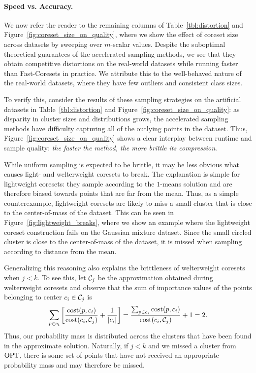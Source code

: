\paragraph*{Speed vs. Accuracy.}



We now refer the reader to the remaining columns of Table~\ref{tbl:distortion} and Figure~\ref{fig:coreset_size_on_quality}, where we show the effect of coreset
size across datasets by sweeping over $m$-scalar values. Despite the suboptimal theoretical guarantees of the accelerated sampling methods, we see that they
obtain competitive distortions on the real-world datasets while running faster than Fast-Coresets in practice. We attribute this to the well-behaved nature of
the real-world datasets, where they have few outliers and consistent class sizes.

To verify this, consider the results of these sampling strategies on the artificial datasets in Table~\ref{tbl:distortion} and
Figure~\ref{fig:coreset_size_on_quality}: as disparity in cluster sizes and distributions grows, the accelerated sampling methods have difficulty capturing all
of the outlying points in the dataset. Thus, Figure~\ref{fig:coreset_size_on_quality} shows a clear interplay between runtime and sample quality: \emph{the
faster the method, the more brittle its compression}.



While uniform sampling is expected to be brittle, it may be less obvious what causes light- and welterweight coresets to break. The explanation is simple for
lightweight coresets: they sample according to the $1$-means solution and are therefore biased towards points that are far from the mean. Thus, as a simple
counterexample, lightweight coresets are likely to miss a small cluster that is close to the center-of-mass of the dataset. This can be seen in
Figure~\ref{fig:lightweight_breaks}, where we show an example where the lightweight coreset construction fails on the Gaussian mixture dataset. Since the small
circled cluster is close to the center-of-mass of the dataset, it is missed when sampling according to distance from the mean.

Generalizing this reasoning also explains the brittleness of welterweight coresets when $j<k$. To see this, let $\mathcal C_j$ be the approximation obtained during
welterweight coresets and observe that the sum of importance values of the points belonging to center $c_i \in \mathcal C_j$ is \[ \sum_{p \in c_i} \left[
\dfrac{\operatorname{cost}(p, c_i)}{\operatorname{cost}(c_i, \mathcal C_j)} + \dfrac{1}{|c_i|} \right] = \dfrac{\sum_{p \in c_i} \operatorname{cost}(p, c_i)}{\operatorname{cost}(c_i, \mathcal C_j)} + 1 = 2.\] Thus, our
probability mass is distributed across the clusters that have been found in the approximate solution. Naturally, if $j < k$ and we missed a cluster from $\text{OPT}$,
there is some set of points that have not received an appropriate probability mass and may therefore be missed.

